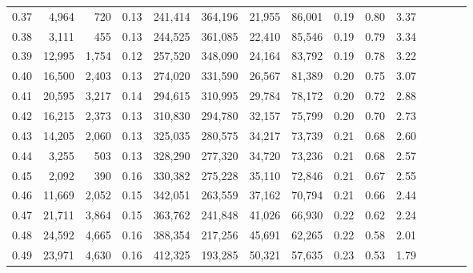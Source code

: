 \begin{tabular}{rrrcrrrrrrrrrrr}
0.37 &   4,964 &    720 &                                       0.13 &  241,414 &  364,196 &   21,955 &   86,001 &  0.19 &  0.80 &                         3.37 \\
0.38 &   3,111 &    455 &                                       0.13 &  244,525 &  361,085 &   22,410 &   85,546 &  0.19 &  0.79 &                         3.34 \\
0.39 &  12,995 &  1,754 &                                       0.12 &  257,520 &  348,090 &   24,164 &   83,792 &  0.19 &  0.78 &                         3.22 \\
0.40 &  16,500 &  2,403 &                                       0.13 &  274,020 &  331,590 &   26,567 &   81,389 &  0.20 &  0.75 &                         3.07 \\
0.41 &  20,595 &  3,217 &                                       0.14 &  294,615 &  310,995 &   29,784 &   78,172 &  0.20 &  0.72 &                         2.88 \\
0.42 &  16,215 &  2,373 &                                       0.13 &  310,830 &  294,780 &   32,157 &   75,799 &  0.20 &  0.70 &                         2.73 \\
0.43 &  14,205 &  2,060 &                                       0.13 &  325,035 &  280,575 &   34,217 &   73,739 &  0.21 &  0.68 &                         2.60 \\
0.44 &   3,255 &    503 &                                       0.13 &  328,290 &  277,320 &   34,720 &   73,236 &  0.21 &  0.68 &                         2.57 \\
0.45 &   2,092 &    390 &                                       0.16 &  330,382 &  275,228 &   35,110 &   72,846 &  0.21 &  0.67 &                         2.55 \\
0.46 &  11,669 &  2,052 &                                       0.15 &  342,051 &  263,559 &   37,162 &   70,794 &  0.21 &  0.66 &                         2.44 \\
0.47 &  21,711 &  3,864 &                                       0.15 &  363,762 &  241,848 &   41,026 &   66,930 &  0.22 &  0.62 &                         2.24 \\
0.48 &  24,592 &  4,665 &                                       0.16 &  388,354 &  217,256 &   45,691 &   62,265 &  0.22 &  0.58 &                         2.01 \\
0.49 &  23,971 &  4,630 &                                       0.16 &  412,325 &  193,285 &   50,321 &   57,635 &  0.23 &  0.53 &                         1.79 \\

\end{tabular}
